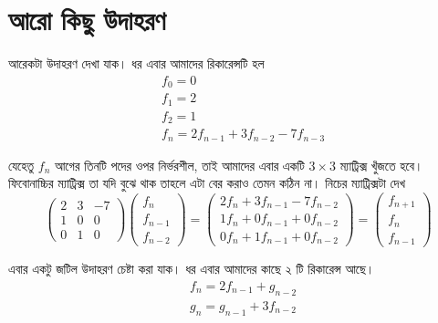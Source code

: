 \section{আরো কিছু উদাহরণ}

আরেকটা উদাহরণ দেখা যাক। ধর এবার আমাদের রিকারেন্সটি হল 
\begin{align*}  
& f_{0} = 0 \\
& f_{1} = 2 \\
& f_{2} = 1 \\
& f_{n} = 2f_{n - 1} + 3f_{n - 2} - 7f_{n - 3}
\end{align*}

যেহেতু $f_{n}$ আগের তিনটি পদের ওপর নির্ভরশীল, তাই আমাদের এবার একটি $3 \times 3$ ম্যাট্রিক্স খুঁজতে হবে। ফিবোনাচ্চির ম্যাট্রিক্স তা যদি বুঝে থাক তাহলে এটা বের করাও তেমন কঠিন না। নিচের ম্যাট্রিক্সটা দেখ 
$$
\begin{pmatrix}
2 & 3 & -7 \\
1 & 0 & 0 \\
0 & 1 & 0
\end{pmatrix} 
\begin{pmatrix}
f_{n} \\
f_{n - 1} \\ 
f_{n - 2}
\end{pmatrix}
= 
\begin{pmatrix}
2f_{n} + 3f_{n - 1} - 7f_{n - 2}\\
1f_{n} + 0f_{n - 1} + 0f_{n - 2} \\
0f_{n} + 1f_{n - 1} + 0f_{n - 2}
\end{pmatrix}
=
\begin{pmatrix}
f_{n + 1} \\
f_{n} \\
f_{n - 1}
\end{pmatrix}
$$ 

এবার একটু জটিল উদাহরণ চেষ্টা করা যাক। ধর এবার আমাদের কাছে ২ টি রিকারেন্স আছে। 
\begin{align*}
& f_{n} = 2f_{n - 1} + g_{n - 2} \\
& g_{n} = g_{n - 1} + 3f_{n - 2} \\
\end{align*}

